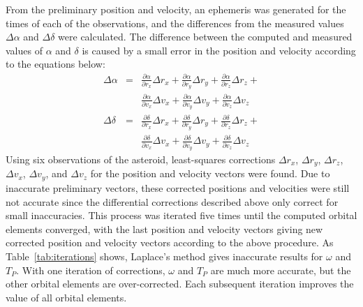 \documentclass[12pt,journal,compsoc]{IEEEtran}
\begin{document}
From the preliminary position and velocity, 
an ephemeris was generated for the times of each of the observations, 
and the differences from the measured values $\Delta \alpha$ and $\Delta \delta$ were calculated.
The difference between the computed and measured values of $\alpha$ and $\delta$ 
is caused by a small error in the position and velocity according to the equations below:
\begin{eqnarray*}
\Delta \alpha &=& \frac{\partial \alpha}{\partial r_x} \Delta r_x + \frac{\partial \alpha}{\partial r_y} \Delta r_y + \frac{\partial \alpha}{\partial r_z} \Delta r_z + \\& &
\frac{\partial \alpha}{\partial v_x} \Delta v_x + \frac{\partial \alpha}{\partial v_y} \Delta v_y + \frac{\partial \alpha}{\partial v_z} \Delta v_z \\
\Delta \delta &=& \frac{\partial \delta}{\partial r_x} \Delta r_x + \frac{\partial \delta}{\partial r_y} \Delta r_y + \frac{\partial \delta}{\partial r_z} \Delta r_z + \\& &
\frac{\partial \delta}{\partial v_x} \Delta v_x + \frac{\partial \delta}{\partial v_y} \Delta v_y + \frac{\partial \delta}{\partial v_z} \Delta v_z
\end{eqnarray*}
Using six observations of the asteroid, 
least-squares corrections $\Delta r_x$, $\Delta r_y$, $\Delta r_z$, $\Delta v_x$, $\Delta v_y$, and $\Delta v_z$ 
for the position and velocity vectors were found.
Due to inaccurate preliminary vectors, 
these corrected positions and velocities were still not accurate since the differential corrections described above 
only correct for small inaccuracies.
This process was iterated five times until the computed orbital elements converged,
with the last position and velocity vectors giving new corrected position and velocity vectors according to the 
above procedure. 
As Table~\ref{tab:iterations} shows, 
Laplace's method gives inaccurate results for $\omega$ and $T_P$.
With one iteration of corrections, $\omega$ and $T_P$ are much more accurate, but the other orbital elements
are over-corrected. Each subsequent iteration improves the value of all orbital elements.
\end{document}

